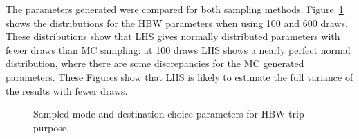 \documentclass[
  letterpaper,
  authoryear,
  review,
  3p]{elsarticle}
\begin{document}
The parameters generated were compared for both sampling methods.
Figure~\ref{fig-parameter} shows the distributions for the HBW
parameters when using 100 and 600 draws. These distributions show that
LHS gives normally distributed parameters with fewer draws than MC
sampling: at 100 draws LHS shows a nearly perfect normal distribution,
where there are some discrepancies for the MC generated parameters.
These Figures show that LHS is likely to estimate the full variance of
the results with fewer draws.

\begin{figure}

\begin{minipage}[t]{\linewidth}

{\centering 


}

\end{minipage}%
\newline
\begin{minipage}[t]{\linewidth}

{\centering 


}

\end{minipage}%

\caption{\label{fig-parameter}Sampled mode and destination choice
parameters for HBW trip purpose.}

\end{figure}
\end{document}
